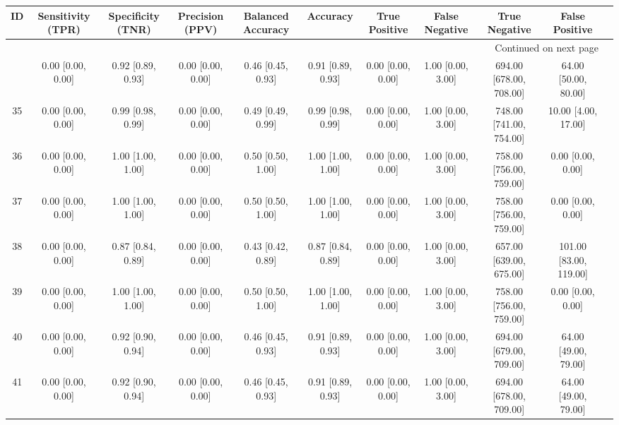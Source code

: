 \documentclass[8pt]{article}
\begin{document}
\begin{center}
\begin{footnotesize}
\begin{longtable}{|ccccccccccc|}
\toprule
 ID &  Sensitivity (TPR) &  Specificity (TNR) &    Precision (PPV) &  Balanced Accuracy &           Accuracy &      True Positive &     False Negative &            True Negative &          False Positive \\
\midrule
\endhead
\midrule
\multicolumn{10}{r}{{Continued on next page}} \\
\midrule
\endfoot

\bottomrule
\endlastfoot
 33 &  0.00 [0.00, 0.00] &  0.92 [0.89, 0.93] &  0.00 [0.00, 0.00] &  0.46 [0.45, 0.93] &  0.91 [0.89, 0.93] &  0.00 [0.00, 0.00] &  1.00 [0.00, 3.00] &  694.00 [678.00, 708.00] &    64.00 [50.00, 80.00] \\
 35 &  0.00 [0.00, 0.00] &  0.99 [0.98, 0.99] &  0.00 [0.00, 0.00] &  0.49 [0.49, 0.99] &  0.99 [0.98, 0.99] &  0.00 [0.00, 0.00] &  1.00 [0.00, 3.00] &  748.00 [741.00, 754.00] &     10.00 [4.00, 17.00] \\
 36 &  0.00 [0.00, 0.00] &  1.00 [1.00, 1.00] &  0.00 [0.00, 0.00] &  0.50 [0.50, 1.00] &  1.00 [1.00, 1.00] &  0.00 [0.00, 0.00] &  1.00 [0.00, 3.00] &  758.00 [756.00, 759.00] &       0.00 [0.00, 0.00] \\
 37 &  0.00 [0.00, 0.00] &  1.00 [1.00, 1.00] &  0.00 [0.00, 0.00] &  0.50 [0.50, 1.00] &  1.00 [1.00, 1.00] &  0.00 [0.00, 0.00] &  1.00 [0.00, 3.00] &  758.00 [756.00, 759.00] &       0.00 [0.00, 0.00] \\
 38 &  0.00 [0.00, 0.00] &  0.87 [0.84, 0.89] &  0.00 [0.00, 0.00] &  0.43 [0.42, 0.89] &  0.87 [0.84, 0.89] &  0.00 [0.00, 0.00] &  1.00 [0.00, 3.00] &  657.00 [639.00, 675.00] &  101.00 [83.00, 119.00] \\
 39 &  0.00 [0.00, 0.00] &  1.00 [1.00, 1.00] &  0.00 [0.00, 0.00] &  0.50 [0.50, 1.00] &  1.00 [1.00, 1.00] &  0.00 [0.00, 0.00] &  1.00 [0.00, 3.00] &  758.00 [756.00, 759.00] &       0.00 [0.00, 0.00] \\
 40 &  0.00 [0.00, 0.00] &  0.92 [0.90, 0.94] &  0.00 [0.00, 0.00] &  0.46 [0.45, 0.93] &  0.91 [0.89, 0.93] &  0.00 [0.00, 0.00] &  1.00 [0.00, 3.00] &  694.00 [679.00, 709.00] &    64.00 [49.00, 79.00] \\
 41 &  0.00 [0.00, 0.00] &  0.92 [0.90, 0.94] &  0.00 [0.00, 0.00] &  0.46 [0.45, 0.93] &  0.91 [0.89, 0.93] &  0.00 [0.00, 0.00] &  1.00 [0.00, 3.00] &  694.00 [678.00, 709.00] &    64.00 [49.00, 79.00] \\

\end{longtable}
\end{footnotesize}
\end{center}
\end{document}
